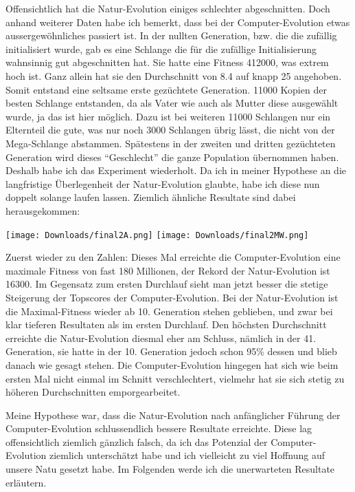 \documentclass[10pt,a4paper,ngerman,english]{article}
\begin{document}
\bigskip
Offensichtlich hat die Natur-Evolution einiges schlechter abgeschnitten. Doch anhand weiterer Daten habe ich bemerkt, dass bei der Computer-Evolution etwas aussergewöhnliches passiert ist. In der nullten Generation, bzw. die die zufällig initialisiert wurde, gab es eine Schlange die für die zufällige Initialisierung wahnsinnig gut abgeschnitten hat. Sie hatte eine Fitness 412000, was extrem hoch ist. Ganz allein hat sie den Durchschnitt von 8.4 auf knapp 25 angehoben. Somit entstand eine seltsame erste gezüchtete Generation. 11000 Kopien der besten Schlange entstanden, da als Vater wie auch als Mutter diese ausgewählt wurde, ja das ist hier möglich. Dazu ist bei weiteren 11000 Schlangen nur ein Elternteil die gute, was nur noch 3000 Schlangen übrig lässt, die nicht von der Mega-Schlange abstammen. Spätestens in der zweiten und dritten gezüchteten Generation wird dieses \enquote{Geschlecht} die ganze Population übernommen haben. Deshalb habe ich das Experiment wiederholt. Da ich in meiner Hypothese an die langfristige Überlegenheit der Natur-Evolution glaubte, habe ich diese nun doppelt solange laufen lassen. Ziemlich ähnliche Resultate sind dabei herausgekommen:

\begin{center}
    \texttt{[image: Downloads/final2A.png]}
    \texttt{[image: Downloads/final2MW.png]}
\end{center}

Zuerst wieder zu den Zahlen: Dieses Mal erreichte die Computer-Evolution eine maximale Fitness von fast 180 Millionen, der Rekord der Natur-Evolution ist 16300. Im Gegensatz zum ersten Durchlauf sieht man jetzt besser die stetige Steigerung der Topscores der Computer-Evolution. Bei der Natur-Evolution ist die Maximal-Fitness wieder ab 10. Generation stehen geblieben, und zwar bei klar tieferen Resultaten als im ersten Durchlauf. Den höchsten Durchschnitt erreichte die Natur-Evolution diesmal eher am Schluss, nämlich in der 41. Generation, sie hatte in der 10. Generation jedoch schon 95\% dessen und blieb danach wie gesagt stehen. Die Computer-Evolution hingegen hat sich wie beim ersten Mal nicht einmal im Schnitt verschlechtert, vielmehr hat sie sich stetig zu höheren Durchschnitten emporgearbeitet.

Meine Hypothese war, dass die Natur-Evolution nach anfänglicher Führung der Computer-Evolution schlussendlich bessere Resultate erreichte. Diese lag offensichtlich ziemlich gänzlich falsch, da ich das Potenzial der Computer-Evolution ziemlich unterschätzt habe und ich vielleicht zu viel Hoffnung auf unsere Natu gesetzt habe. Im Folgenden werde ich die unerwarteten Resultate erläutern.
\end{document}
